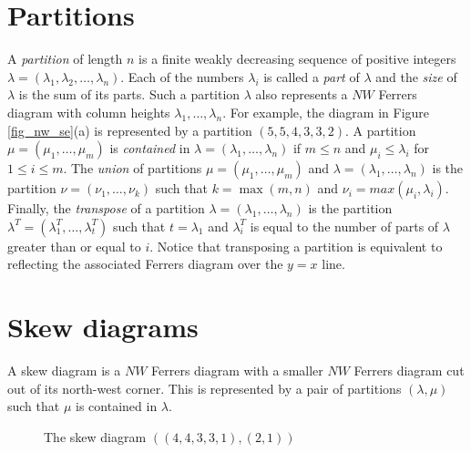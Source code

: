 \section{Partitions}
A \emph{partition} of length $n$ is a finite weakly decreasing sequence of positive integers $\lambda = (\lambda_1, \lambda_2, \ldots, \lambda_n)$. 
Each of the numbers $\lambda_i$ is called a \emph{part} of $\lambda$ and the \emph{size} of $\lambda$ is the sum of its parts.
Such a partition $\lambda$ also represents a $NW$ Ferrers diagram with column heights $\lambda_1, \ldots, \lambda_n$.
For example, the diagram in Figure \ref{fig_nw_se}(a) is represented by a partition $(5, 5, 4, 3, 3, 2)$. 
A partition $\mu = (\mu_1, \ldots, \mu_m)$ is \emph{contained} in $\lambda = (\lambda_1, \ldots, \lambda_n)$ if $m \leq n$
and $\mu_i \leq \lambda_i$ for $1 \leq i \leq m$.
The \emph{union} of partitions $\mu = (\mu_1, \ldots, \mu_m)$ and $\lambda = (\lambda_1, \ldots, \lambda_n)$ is
the partition $\nu = (\nu_1, \ldots, \nu_k)$ such that $k = \max(m, n)$ and $\nu_i = max(\mu_i, \lambda_i)$.
Finally, the \emph{transpose} of a partition $\lambda = (\lambda_1, \ldots, \lambda_n)$ is the partition
$\lambda^T = (\lambda^T_1, \ldots, \lambda^T_t)$ such that $t = \lambda_1$ and $\lambda^T_i$ is equal
to the number of parts of $\lambda$ greater than or equal to $i$. Notice that transposing
a partition is equivalent to reflecting the associated Ferrers diagram over the $y = x$ line.

\section{Skew diagrams}
A skew diagram is a $NW$ Ferrers diagram with a smaller $NW$ Ferrers diagram cut out of its north-west corner. This is represented
by a pair of partitions $(\lambda, \mu)$ such that $\mu$ is contained in $\lambda$.

\begin{figure}[h]
\centering
{}
\caption{The skew diagram $((4,4,3,3,1),(2,1))$}
\end{figure}

